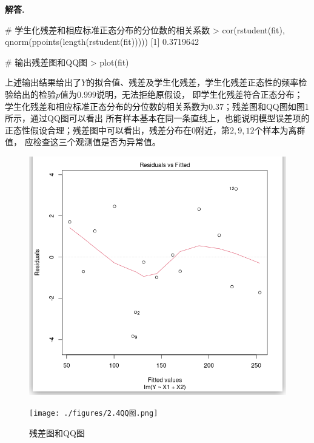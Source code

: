 \documentclass[12pt, a4paper, oneside]{ctexart}
\newenvironment{solution}[1][]{\par\noindent\textbf{#1解答. }}{\smallskip\par}  %
\begin{document}
\begin{solution}
\begin{rcode}
# 学生化残差和相应标准正态分布的分位数的相关系数
> cor(rstudent(fit), qnorm(ppoints(length(rstudent(fit)))))
[1] 0.3719642

# 输出残差图和QQ图
> plot(fit)
\end{rcode}
上述输出结果给出了$Y$的拟合值、残差及学生化残差，学生化残差正态性的频率检验给出的检验$p$值为$0.999$说明，无法拒绝原假设，
即学生化残差符合正态分布；学生化残差和相应标准正态分布的分位数的相关系数为$0.37$；残差图和QQ图如图1所示，通过QQ图可以看出
所有样本基本在同一条直线上，也能说明模型误差项的正态性假设合理；残差图中可以看出，残差分布在$0$附近，第$2,9,12$个样本为离群值，
应检查这三个观测值是否为异常值。
\begin{figure}[H]
    \hspace{-2.2cm}
    \subfigure  %
    {
        \begin{minipage}[b]{.62\linewidth}
            \centering
            \includegraphics[scale=0.4]{./figures/2.4残差图.png}
        \end{minipage}
    }
    \subfigure
    {
        \begin{minipage}[b]{.2\linewidth}
            \centering
            \texttt{[image: ./figures/2.4QQ图.png]}
        \end{minipage}
    }
    \caption{残差图和QQ图}
\end{figure}
\end{solution}
\end{document}
